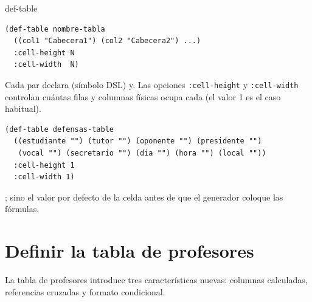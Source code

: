 \documentclass[12pt,a4paper]{report}
\begin{document}
\begin{sintaxisbox}{def-table}
\begin{lstlisting}
(def-table nombre-tabla
  ((col1 "Cabecera1") (col2 "Cabecera2") ...)
  :cell-height N
  :cell-width  N)
\end{lstlisting}
\end{sintaxisbox}

Cada par  declara 
(símbolo DSL) y.  Las opciones \texttt{:cell-height} y \texttt{:cell-width}
controlan cuántas filas y columnas físicas  ocupa cada  (el
valor 1 es el caso habitual).


\begin{lstlisting}[caption={Definicion de defensas-table.}]
(def-table defensas-table
  ((estudiante "") (tutor "") (oponente "") (presidente "")
   (vocal "") (secretario "") (dia "") (hora "") (local ""))
  :cell-height 1
  :cell-width 1)
\end{lstlisting}

;  {sino el valor por defecto de la celda
antes de que el generador coloque las fórmulas.}




\section{Definir la tabla de profesores}
\label{sec:profesores-table}

La tabla de profesores introduce tres características nuevas: columnas
calculadas, referencias cruzadas y formato condicional. 
\end{document}
